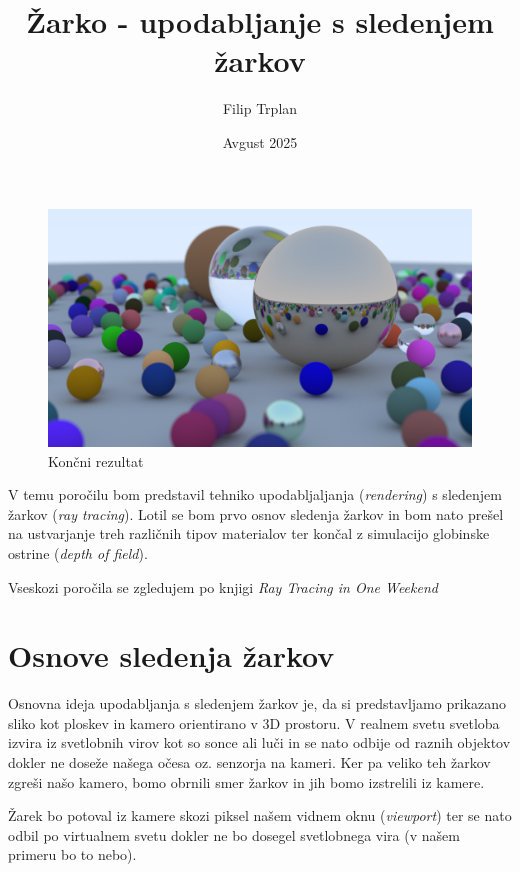 \documentclass[12pt, a4paper]{article}
\title{Žarko - upodabljanje s sledenjem žarkov}
\author{Filip Trplan}
\date{Avgust 2025}
\begin{document}
\maketitle

\begin{figure}[h]
	\centering
	\includegraphics[width=\textwidth]{cover}
	\caption{Končni rezultat}
\end{figure}

V temu poročilu bom predstavil tehniko upodabljaljanja (\textit{rendering}) s sledenjem žarkov
(\textit{ray tracing}). Lotil se bom prvo osnov sledenja žarkov in bom nato prešel na ustvarjanje treh
različnih tipov materialov ter končal z simulacijo globinske ostrine (\textit{depth of field}).

Vseskozi poročila se zgledujem po knjigi \textit{Ray Tracing in One Weekend} \cite{Shirley2025RTW1}

\section{Osnove sledenja žarkov}

Osnovna ideja upodabljanja s sledenjem žarkov je, da si predstavljamo prikazano sliko kot ploskev in kamero
orientirano v 3D prostoru. V realnem svetu svetloba izvira iz svetlobnih virov kot so sonce ali luči in se
nato odbije od raznih objektov dokler ne doseže našega očesa oz. senzorja na kameri. Ker pa veliko teh žarkov
zgreši našo kamero, bomo obrnili smer žarkov in jih bomo izstrelili iz kamere.

Žarek bo potoval iz kamere skozi piksel našem vidnem oknu (\textit{viewport}) ter se nato odbil po
virtualnem svetu dokler ne bo dosegel svetlobnega vira (v našem primeru bo to nebo).
\end{document}

